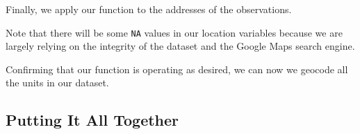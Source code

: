 \documentclass[12pt,twoside]{amherstthesis}
\newenvironment{Shaded}{\begin{snugshade}}{\end{snugshade}}
\newcommand{\KeywordTok}[1]{\textcolor[rgb]{0.13,0.29,0.53}{\textbf{#1}}}
\newcommand{\StringTok}[1]{\textcolor[rgb]{0.31,0.60,0.02}{#1}}
\newcommand{\OperatorTok}[1]{\textcolor[rgb]{0.81,0.36,0.00}{\textbf{#1}}}
\newcommand{\NormalTok}[1]{#1}
\begin{document}
Finally, we apply our function to the addresses of the observations.
\begin{Shaded}
\end{Shaded}
Note that there will be some \texttt{NA} values in our location
variables because we are largely relying on the integrity of the dataset
and the Google Maps search engine.

Confirming that our function is operating as desired, we can now we
geocode all the units in our dataset.

\subsection{Putting It All Together}\label{putting-it-all-together}
\end{document}
